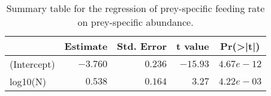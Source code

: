\begin{table}[!htbp]
\caption{Summary table for the regression of prey-specific feeding rate 
  on prey-specific abundance.\label{tab:FN}} 
\begin{center}
\begin{tabular}{lrrrr}
\hline
\multicolumn{1}{l}{}&\multicolumn{1}{c}{Estimate}&\multicolumn{1}{c}{Std. Error}&\multicolumn{1}{c}{t value}&\multicolumn{1}{c}{Pr(\textgreater |t|)}\tabularnewline
\hline
(Intercept)&$-3.760$&$0.236$&$-15.93$&$4.67e-12$\tabularnewline
log10(N)&$ 0.538$&$0.164$&$  3.27$&$4.22e-03$\tabularnewline
\hline
\end{tabular}\end{center}
\end{table}
